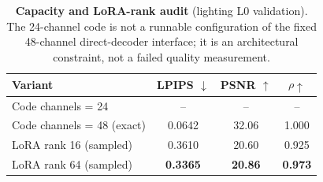\begin{table}[t]
\centering
\caption{\textbf{Capacity and LoRA-rank audit} (lighting L0 validation). The 24-channel code is not a runnable configuration of the fixed 48-channel direct-decoder interface; it is an architectural constraint, not a failed quality measurement.}
\label{tab:capacity_ablation}
\scriptsize\setlength{\tabcolsep}{4pt}
\begin{tabular*}{\linewidth}{@{\extracolsep{\fill}}lccc@{}}
\toprule
Variant & LPIPS $\downarrow$ & PSNR $\uparrow$ & $\rho\uparrow$ \\
\midrule
Code channels = 24 & -- & -- & -- \\
Code channels = 48 (exact) & 0.0642 & 32.06 & 1.000 \\
LoRA rank 16 (sampled) & 0.3610 & 20.60 & 0.925 \\
LoRA rank 64 (sampled) & \textbf{0.3365} & \textbf{20.86} & \textbf{0.973} \\
\bottomrule
\end{tabular*}
\end{table}
